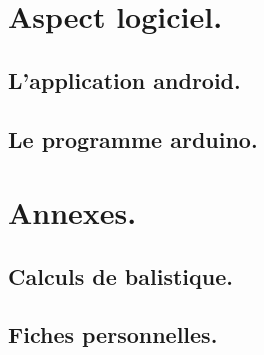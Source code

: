 \documentclass{report}
\begin{document}
\part{Aspect logiciel.}
\chapter{L'application android.} \label{andro}


\chapter{Le programme arduino.} \label{ardui}


\part{Annexes.}
\appendix

\chapter{Calculs de balistique.} \label{balis}
% 

\chapter{Fiches personnelles.}

\newpage
\listoffigures
{}
\end{document}
